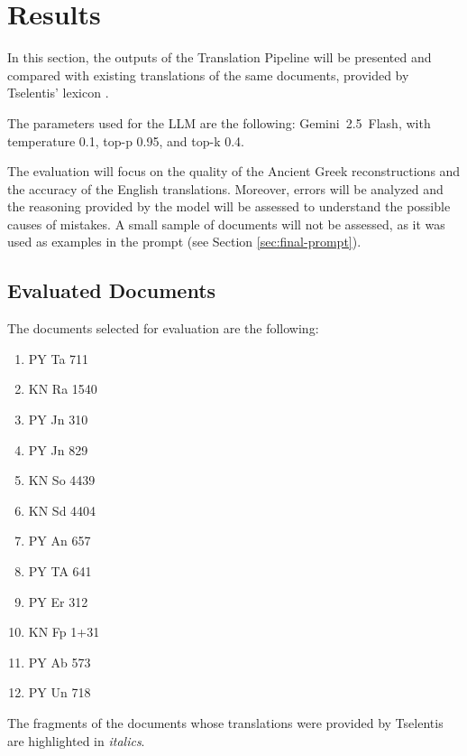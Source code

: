 \section{Results} \label{sec:translations}
In this section, the outputs of the Translation Pipeline will be presented and compared with existing translations of the same documents, provided by Tselentis' lexicon \cite{tselentis}.

The parameters used for the LLM are the following: Gemini~2.5~Flash, with temperature 0.1, top-p 0.95, and top-k 0.4.

The evaluation will focus on the quality of the Ancient Greek reconstructions and the accuracy of the English translations.
Moreover, errors will be analyzed and the reasoning provided by the model will be assessed to understand the possible causes of mistakes.
A small sample of documents will not be assessed, as it was used as examples in the prompt (see Section \ref{sec:final-prompt}).

\subsection{Evaluated Documents}
The documents selected for evaluation are the following:
\begin{enumerate}[label=(\roman*)]
\item PY Ta 711
\item KN Ra 1540
\item PY Jn 310
\item PY Jn 829
\item KN So 4439
\item KN Sd 4404
\item PY An 657
\item PY TA 641
\item PY Er 312
\item KN Fp 1+31
\item PY Ab 573
\item PY Un 718
\end{enumerate}

The fragments of the documents whose translations were provided by Tselentis are highlighted in \emph{italics}.

